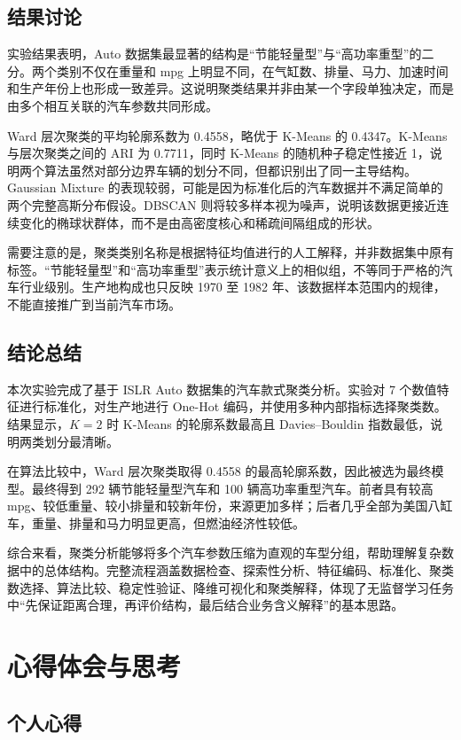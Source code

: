 \documentclass[UTF8,a4paper,12pt]{ctexart}
\begin{document}
\subsection{结果讨论}

实验结果表明，Auto 数据集最显著的结构是“节能轻量型”与“高功率重型”的二分。两个类别不仅在重量和 mpg 上明显不同，在气缸数、排量、马力、加速时间和生产年份上也形成一致差异。这说明聚类结果并非由某一个字段单独决定，而是由多个相互关联的汽车参数共同形成。

Ward 层次聚类的平均轮廓系数为 0.4558，略优于 K-Means 的 0.4347。K-Means 与层次聚类之间的 ARI 为 0.7711，同时 K-Means 的随机种子稳定性接近 1，说明两个算法虽然对部分边界车辆的划分不同，但都识别出了同一主导结构。Gaussian Mixture 的表现较弱，可能是因为标准化后的汽车数据并不满足简单的两个完整高斯分布假设。DBSCAN 则将较多样本视为噪声，说明该数据更接近连续变化的椭球状群体，而不是由高密度核心和稀疏间隔组成的形状。

需要注意的是，聚类类别名称是根据特征均值进行的人工解释，并非数据集中原有标签。“节能轻量型”和“高功率重型”表示统计意义上的相似组，不等同于严格的汽车行业级别。生产地构成也只反映 1970 至 1982 年、该数据样本范围内的规律，不能直接推广到当前汽车市场。

\subsection{结论总结}

本次实验完成了基于 ISLR Auto 数据集的汽车款式聚类分析。实验对 7 个数值特征进行标准化，对生产地进行 One-Hot 编码，并使用多种内部指标选择聚类数。结果显示，$K=2$ 时 K-Means 的轮廓系数最高且 Davies--Bouldin 指数最低，说明两类划分最清晰。

在算法比较中，Ward 层次聚类取得 0.4558 的最高轮廓系数，因此被选为最终模型。最终得到 292 辆节能轻量型汽车和 100 辆高功率重型汽车。前者具有较高 mpg、较低重量、较小排量和较新年份，来源更加多样；后者几乎全部为美国八缸车，重量、排量和马力明显更高，但燃油经济性较低。

综合来看，聚类分析能够将多个汽车参数压缩为直观的车型分组，帮助理解复杂数据中的总体结构。完整流程涵盖数据检查、探索性分析、特征编码、标准化、聚类数选择、算法比较、稳定性验证、降维可视化和聚类解释，体现了无监督学习任务中“先保证距离合理，再评价结构，最后结合业务含义解释”的基本思路。

\section{心得体会与思考}

\subsection{个人心得}
\end{document}
